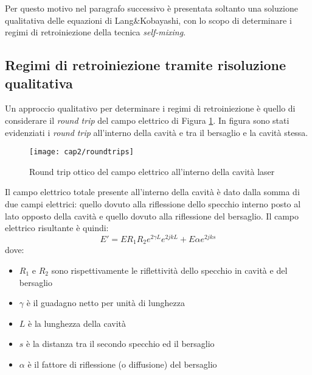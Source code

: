 Per questo motivo nel paragrafo successivo è presentata soltanto una soluzione qualitativa delle equazioni di Lang\&Kobayashi, con lo scopo di determinare i regimi di retroiniezione della tecnica \textit{self-mixing}.

\subsection{Regimi di retroiniezione tramite risoluzione qualitativa}

Un approccio qualitativo per determinare i regimi di retroiniezione è quello di considerare il \textit{round trip} del campo elettrico di Figura \ref{roundtrips}. In figura sono stati evidenziati i \textit{round trip} all'interno della cavità e tra il bersaglio e la cavità stessa.

\begin{figure}[H]
	\begin{center}
		\texttt{[image: cap2/roundtrips]}
		\caption{Round trip ottico del campo elettrico all'interno della cavità laser}
		\label{roundtrips}
	\end{center}
\end{figure}

Il campo elettrico totale presente all'interno della cavità è dato dalla somma di due campi elettrici: quello dovuto alla riflessione dello specchio interno posto al lato opposto della cavità e quello dovuto alla riflessione del bersaglio. Il campo elettrico risultante è quindi:
\begin{equation}
	E'=ER_1R_2e^{2\gamma L}e^{2jkL}+E\alpha e^{2jks}
\end{equation}
dove:
\begin{itemize}
	\item $R_1$ e $R_2$ sono rispettivamente le riflettività dello specchio in cavità e del bersaglio
	\item $\gamma$ è il guadagno netto per unità di lunghezza
	\item $L$ è la lunghezza della cavità
	\item $s$ è la distanza tra il secondo specchio ed il bersaglio
	\item $\alpha$ è il fattore di riflessione (o diffusione) del bersaglio
\end{itemize}

